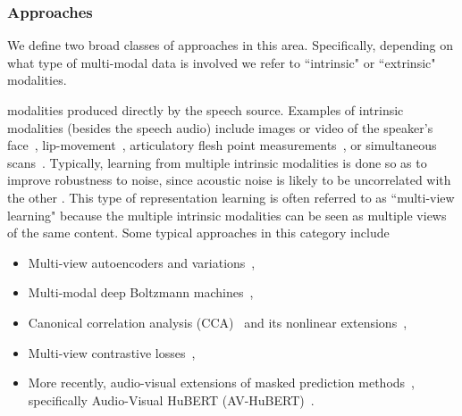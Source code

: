 \subsubsection{Approaches}
We define two broad classes of approaches in this area. Specifically, depending on what type of multi-modal data is involved we refer to ``intrinsic" or ``extrinsic" modalities.

modalities produced directly by the speech source.  Examples of intrinsic modalities (besides the speech audio) include images or video of the speaker's face~\cite{lee2004avicar,chung2016lip}, lip-movement~\cite{shi2022learning}, articulatory flesh point measurements~\cite{westbury1990x,wrench2001new}, or simultaneous  scans~\cite{narayanan2011multimodal}.  Typically, learning from multiple intrinsic modalities is done so as to improve robustness to noise, since acoustic noise is likely to be uncorrelated with the other .  This type of representation learning is often referred to as ``multi-view learning" because the multiple intrinsic modalities can be seen as multiple views of the same content. Some typical approaches in this category include
\begin{itemize}
    \item Multi-view autoencoders and variations~\cite{ngiam2011multimodal,badino2016integrating},
    \item Multi-modal deep Boltzmann machines~\cite{srivastava2012multimodal},
    \item Canonical correlation analysis (CCA)~\cite{hotelling1936relations} and its nonlinear extensions~\cite{andrew2013deep,wang2015deep,wang2016deep,michaeli2016nonparametric,Melzer_01a,LaiFyfe00a,LaiFyfe99a,BachJordan05a,wang_15a},
    \item Multi-view contrastive losses~\cite{HermanBlunsom14a,Huang_13b},
    \item More recently, audio-visual extensions of masked prediction methods~\cite{shi2022learning,shi2022robust}, specifically Audio-Visual HuBERT (AV-HuBERT)~\cite{shi2022learning}.
\end{itemize}

